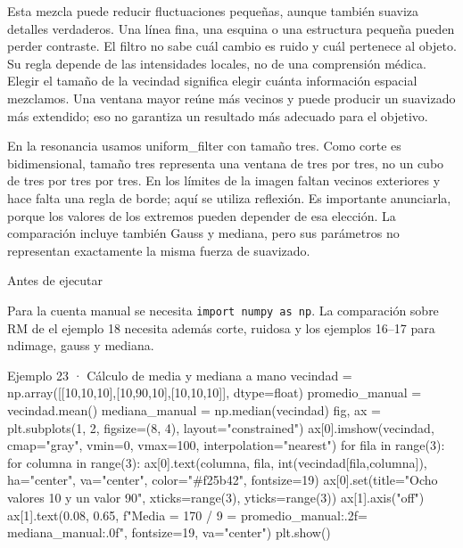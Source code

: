 Esta mezcla puede reducir fluctuaciones pequeñas, aunque también suaviza detalles verdaderos. Una línea fina, una esquina o una estructura pequeña pueden perder contraste. El filtro no sabe cuál cambio es ruido y cuál pertenece al objeto. Su regla depende de las intensidades locales, no de una comprensión médica. Elegir el tamaño de la vecindad significa elegir cuánta información espacial mezclamos. Una ventana mayor reúne más vecinos y puede producir un suavizado más extendido; eso no garantiza un resultado más adecuado para el objetivo.


En la resonancia usamos uniform\_filter con tamaño tres. Como corte es bidimensional, tamaño tres representa una ventana de tres por tres, no un cubo de tres por tres por tres. En los límites de la imagen faltan vecinos exteriores y hace falta una regla de borde; aquí se utiliza reflexión. Es importante anunciarla, porque los valores de los extremos pueden depender de esa elección. La comparación incluye también Gauss y mediana, pero sus parámetros no representan exactamente la misma fuerza de suavizado.



\begin{Idea}{Antes de ejecutar}

Para la cuenta manual se necesita \texttt{import numpy as np}. La comparación sobre RM de el ejemplo 18 necesita además corte, ruidosa y los ejemplos 16–17 para ndimage, gauss y mediana. 


\end{Idea}

\begin{Codigo}{Ejemplo 23 · Cálculo de media y mediana a mano}
vecindad = np.array([[10,10,10],[10,90,10],[10,10,10]], dtype=float)
promedio_manual = vecindad.mean()
mediana_manual = np.median(vecindad)
fig, ax = plt.subplots(1, 2, figsize=(8, 4), layout="constrained")
ax[0].imshow(vecindad, cmap="gray", vmin=0, vmax=100, interpolation="nearest")
for fila in range(3):
    for columna in range(3):
        ax[0].text(columna, fila, int(vecindad[fila,columna]), ha="center", va="center", color="#f25b42", fontsize=19)
ax[0].set(title="Ocho valores 10 y un valor 90", xticks=range(3), yticks=range(3))
ax[1].axis("off")
ax[1].text(0.08, 0.65, f"Media = 170 / 9 = {promedio_manual:.2f}\n\nMediana = {mediana_manual:.0f}", fontsize=19, va="center")
plt.show()
\end{Codigo}


